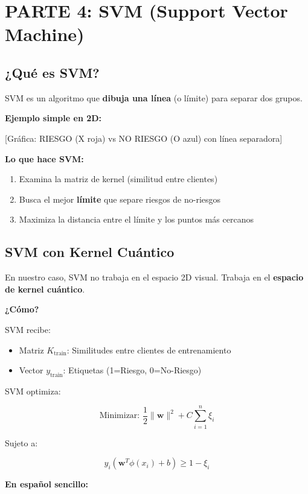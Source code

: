 \documentclass[11pt,a4paper,spanish]{article}
\begin{document}
\section{PARTE 4: SVM (Support Vector Machine)}

\subsection{¿Qué es SVM?}

SVM es un algoritmo que \textbf{dibuja una línea} (o límite) para separar dos grupos.

\textbf{Ejemplo simple en 2D:}

[Gráfica: RIESGO (X roja) vs NO RIESGO (O azul) con línea separadora]

\textbf{Lo que hace SVM:}

\begin{enumerate}
    \item Examina la matriz de kernel (similitud entre clientes)
    \item Busca el mejor \textbf{límite} que separe riesgos de no-riesgos
    \item Maximiza la distancia entre el límite y los puntos más cercanos
\end{enumerate}

\subsection{SVM con Kernel Cuántico}

En nuestro caso, SVM no trabaja en el espacio 2D visual. Trabaja en el \textbf{espacio de kernel cuántico}.

\textbf{¿Cómo?}

SVM recibe:
\begin{itemize}
    \item Matriz $K_{\text{train}}$: Similitudes entre clientes de entrenamiento
    \item Vector $y_{\text{train}}$: Etiquetas (1=Riesgo, 0=No-Riesgo)
\end{itemize}

SVM optimiza:

\[
\text{Minimizar: } \frac{1}{2}\|\mathbf{w}\|^2 + C\sum_{i=1}^{n} \xi_i
\]

Sujeto a:

\[
y_i(\mathbf{w}^T \phi(x_i) + b) \geq 1 - \xi_i
\]

\textbf{En español sencillo:}
\end{document}

